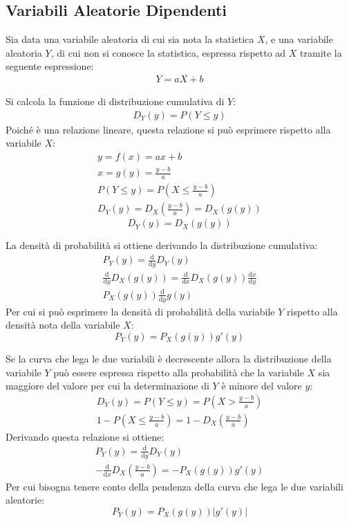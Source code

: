 \documentclass{article}
\newcommand{\df}{\mathrm{d}}
\numberwithin{equation}{subsection}
\begin{document}
\subsection{Variabili Aleatorie Dipendenti}

Sia data una variabile aleatoria di cui sia nota la statistica $X$, e una variabile aleatoria $Y$, di cui non si conosce la statistica, espressa rispetto ad $X$ tramite la 
seguente espressione:
\begin{gather*}
    Y=aX+b
\end{gather*}

Si calcola la funzione di distribuzione cumulativa di $Y$:
\begin{gather*}
    D_Y(y)=P(Y\leq y)
\end{gather*}
Poiché è una relazione lineare, questa relazione si può esprimere rispetto alla variabile $X$:
\begin{gather*}
    y=f(x)=ax+b\\
    x=g(y)=\displaystyle\frac{y-b}{a}\\
    P(Y\leq y)=P\left(X\leq\displaystyle\frac{y-b}{a}\right)\\
    D_Y(y)=D_X\left(\displaystyle\frac{y-b}{a}\right)=D_X(g(y))
\end{gather*}
\begin{equation}
    D_Y(y)=D_X(g(y))
\end{equation}

La densità di probabilità si ottiene derivando la distribuzione cumulativa:
\begin{gather*}
    P_Y(y)=\displaystyle\frac{\df}{\df y}D_Y(y)\\
    \frac{\df}{\df y}D_X(g(y))=\frac{\df}{\df x}D_X(g(y))\frac{\df x}{\df y}\\ %
    P_X(g(y))\frac{\df}{\df y}g(y)
\end{gather*}
Per cui si può esprimere la densità di probabilità della variabile $Y$ rispetto alla densità nota della variabile $X$:
\begin{equation*}
    P_Y(y)=P_X(g(y))g'(y)
\end{equation*}

Se la curva che lega le due variabili è decrescente allora la distribuzione della variabile $Y$ può essere espressa rispetto alla probabilità che la variabile $X$ sia 
maggiore del valore per cui la determinazione di $Y$ è minore del valore $y$: 
\begin{gather*}
    D_Y(y)=P(Y\leq y)=P\left(\displaystyle X>\frac{y-b}{a}\right)\\
    1-P\left(X\leq\frac{y-b}{a}\right)=1-D_X\left(\frac{y-b}{a}\right)
\end{gather*}
Derivando questa relazione si ottiene:
\begin{gather*}
    P_Y(y)=\displaystyle\frac{\df}{\df y}D_Y(y)\\
    -\displaystyle\frac{\df}{\df x}D_X\left(\frac{y-b}{a}\right)=-P_X(g(y))g'(y)
\end{gather*}
Per cui bisogna tenere conto della pendenza della curva che lega le due variabili aleatorie:
\begin{equation}
    P_Y(y)=P_X(g(y))\left|g'(y)\right|
\end{equation}
\end{document}

